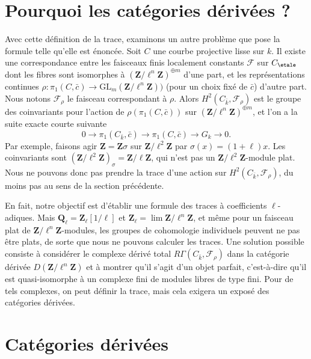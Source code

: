 \section{Pourquoi les catégories dérivées ?}
\label{section-derived-categories-why}

\noindent
Avec cette définition de la trace, examinons un autre problème que pose la
formule telle qu'elle est énoncée. Soit $C$ une courbe projective lisse sur $k$. Il existe
une correspondance entre les faisceaux finis localement constants $\mathcal{F}$ sur
$C_\etale$ dont les fibres sont isomorphes à
${(\mathbf{Z}/\ell^n\mathbf{Z})}^{\oplus m}$ d'une part, et les représentations continues
$\rho : \pi_1 (C, \bar c) \to
\text{GL}_m(\mathbf{Z}/\ell^n\mathbf{Z}))$ (pour un choix fixé de $\bar c$)
d'autre part. Nous notons $\mathcal{F}_\rho$ le faisceau correspondant à
$\rho$. Alors $H^2 (C_{\bar k}, \mathcal{F}_\rho)$ est le groupe des coinvariants
pour l'action de $\rho(\pi_1 (C, \bar c))$ sur
${(\mathbf{Z}/\ell^n\mathbf{Z})}^{\oplus m}$, et l'on a la suite exacte courte
suivante
$$
0 \longrightarrow \pi_1 (C_{\bar k}, \bar c) \longrightarrow \pi_1 (C, \bar c)
\longrightarrow G_k \longrightarrow 0.
$$
Par exemple, faisons agir $\mathbf{Z} = \mathbf{Z} \sigma$ sur
$\mathbf{Z}/\ell^2\mathbf{Z}$ par $\sigma(x) = (1+\ell) x$. Les coinvariants
sont $(\mathbf{Z}/\ell^2\mathbf{Z})_{\sigma} = \mathbf{Z}/\ell\mathbf{Z}$, qui
n'est pas un $\mathbf{Z}/\ell^2\mathbf{Z}$-module plat. Nous ne pouvons donc pas prendre la
trace d'une action sur $H^2(C_{\bar k}, \mathcal{F}_\rho)$, du moins pas au
sens de la section précédente.

\medskip\noindent
En fait, notre objectif est d'établir une formule des traces à coefficients $\ell$-adiques.
Mais $\mathbf{Q}_\ell = \mathbf{Z}_\ell[1/\ell]$ et $\mathbf{Z}_\ell =
\lim \mathbf{Z}/\ell^n\mathbf{Z}$, et même pour un faisceau plat de
$\mathbf{Z}/\ell^n\mathbf{Z}$-modules, les groupes de cohomologie individuels peuvent ne pas
être plats, de sorte que nous ne pouvons calculer les traces. Une solution possible consiste à considérer le complexe
dérivé total $R\Gamma(C_{\bar k}, \mathcal{F}_\rho)$ dans la catégorie dérivée
$D(\mathbf{Z}/\ell^n\mathbf{Z})$ et à montrer qu'il s'agit d'un objet parfait, c'est-à-dire
qu'il est quasi-isomorphe à un complexe fini de modules libres de type fini.
Pour de tels complexes, on peut définir la trace, mais cela exigera un exposé
des catégories dérivées.






\section{Catégories dérivées}
\label{section-derived-categories}

